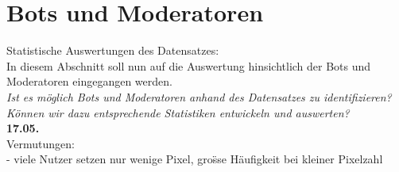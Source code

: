\section{Bots und Moderatoren} \label{question2} %

Statistische Auswertungen des Datensatzes:\\
In diesem Abschnitt soll nun auf die Auswertung hinsichtlich der Bots und Moderatoren eingegangen werden. \\
\textit{Ist es m{\"o}glich Bots und Moderatoren anhand des Datensatzes zu identifizieren?}\\
\textit{K{\"o}nnen wir dazu entsprechende Statistiken entwickeln und auswerten?}\\
\textbf{17.05.}\\
Vermutungen:\\
- viele Nutzer setzen nur wenige Pixel, gro{\"ss}e H{\"a}ufigkeit bei kleiner Pixelzahl\\
